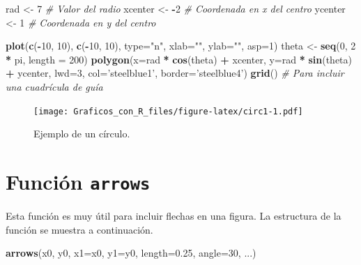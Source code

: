 \documentclass[10pt,]{krantz}
\makeatletter
\newenvironment{Shaded}{\begin{snugshade}}{\end{snugshade}}
\newcommand{\KeywordTok}[1]{\textcolor[rgb]{0.13,0.29,0.53}{\textbf{#1}}}
\newcommand{\DataTypeTok}[1]{\textcolor[rgb]{0.13,0.29,0.53}{#1}}
\newcommand{\DecValTok}[1]{\textcolor[rgb]{0.00,0.00,0.81}{#1}}
\newcommand{\FloatTok}[1]{\textcolor[rgb]{0.00,0.00,0.81}{#1}}
\newcommand{\StringTok}[1]{\textcolor[rgb]{0.31,0.60,0.02}{#1}}
\newcommand{\CommentTok}[1]{\textcolor[rgb]{0.56,0.35,0.01}{\textit{#1}}}
\newcommand{\OperatorTok}[1]{\textcolor[rgb]{0.81,0.36,0.00}{\textbf{#1}}}
\newcommand{\NormalTok}[1]{#1}
\newenvironment{kframe}{%
\medskip{}
\setlength{\fboxsep}{.8em}
 \def\at@end@of@kframe{}%
 \ifinner\ifhmode%
  \def\at@end@of@kframe{\end{minipage}}%
  \begin{minipage}{\columnwidth}%
 \fi\fi%
 \def\FrameCommand##1{\hskip\@totalleftmargin \hskip-\fboxsep
 \colorbox{shadecolor}{##1}\hskip-\fboxsep
     \hskip-\linewidth \hskip-\@totalleftmargin \hskip\columnwidth}%
 \MakeFramed {\advance\hsize-\width
   \@totalleftmargin\z@ \linewidth\hsize
   \@setminipage}}%
 {\par\unskip\endMakeFramed%
 \at@end@of@kframe}
\renewenvironment{Shaded}{\begin{kframe}}{\end{kframe}}
\makeatother
\begin{document}
\begin{Shaded}
\begin{Highlighting}[]
\NormalTok{rad     <-}\StringTok{ }\DecValTok{7}   \CommentTok{# Valor del radio}
\NormalTok{xcenter <-}\StringTok{ }\OperatorTok{-}\DecValTok{2}  \CommentTok{# Coordenada en x del centro}
\NormalTok{ycenter <-}\StringTok{ }\DecValTok{1}   \CommentTok{# Coordenada en y del centro}

\KeywordTok{plot}\NormalTok{(}\KeywordTok{c}\NormalTok{(}\OperatorTok{-}\DecValTok{10}\NormalTok{, }\DecValTok{10}\NormalTok{), }\KeywordTok{c}\NormalTok{(}\OperatorTok{-}\DecValTok{10}\NormalTok{, }\DecValTok{10}\NormalTok{), }\DataTypeTok{type=}\StringTok{"n"}\NormalTok{, }\DataTypeTok{xlab=}\StringTok{""}\NormalTok{, }\DataTypeTok{ylab=}\StringTok{""}\NormalTok{, }\DataTypeTok{asp=}\DecValTok{1}\NormalTok{)}
\NormalTok{theta <-}\StringTok{ }\KeywordTok{seq}\NormalTok{(}\DecValTok{0}\NormalTok{, }\DecValTok{2} \OperatorTok{*}\StringTok{ }\NormalTok{pi, }\DataTypeTok{length =} \DecValTok{200}\NormalTok{)}
\KeywordTok{polygon}\NormalTok{(}\DataTypeTok{x=}\NormalTok{rad }\OperatorTok{*}\StringTok{ }\KeywordTok{cos}\NormalTok{(theta) }\OperatorTok{+}\StringTok{ }\NormalTok{xcenter,}
        \DataTypeTok{y=}\NormalTok{rad }\OperatorTok{*}\StringTok{ }\KeywordTok{sin}\NormalTok{(theta) }\OperatorTok{+}\StringTok{ }\NormalTok{ycenter,}
        \DataTypeTok{lwd=}\DecValTok{3}\NormalTok{, }\DataTypeTok{col=}\StringTok{'steelblue1'}\NormalTok{, }\DataTypeTok{border=}\StringTok{'steelblue4'}\NormalTok{)}
\KeywordTok{grid}\NormalTok{()  }\CommentTok{# Para incluir una cuadrícula de guía}
\end{Highlighting}
\end{Shaded}

\begin{figure}
\centering
\texttt{[image: Graficos\_con\_R\_files/figure-latex/circ1-1.pdf]}
\caption{\label{fig:circ1}Ejemplo de un círculo.}
\end{figure}

\section{\texorpdfstring{Función \texttt{arrows} 
}{Función arrows  }}\label{funcion-arrows}

Esta función es muy útil para incluir flechas en una figura. La
estructura de la función se muestra a continuación.

\begin{Shaded}
\begin{Highlighting}[]
\KeywordTok{arrows}\NormalTok{(x0, y0, }\DataTypeTok{x1=}\NormalTok{x0, }\DataTypeTok{y1=}\NormalTok{y0, }\DataTypeTok{length=}\FloatTok{0.25}\NormalTok{, }\DataTypeTok{angle=}\DecValTok{30}\NormalTok{, ...)}
\end{Highlighting}
\end{Shaded}
\end{document}
